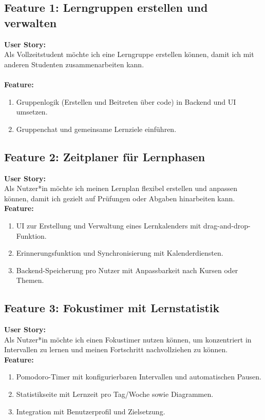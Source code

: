 \documentclass[12pt,a4paper]{article}
\begin{document}
\subsection{Feature 1: Lerngruppen erstellen und verwalten}
\textbf{User Story:}\\
Als Vollzeitstudent möchte ich eine Lerngruppe erstellen können, damit ich mit anderen Studenten zusammenarbeiten kann.\\\\
\textbf{Feature:}
\begin{enumerate}
    \item Gruppenlogik (Erstellen und Beitreten über code) in Backend und UI umsetzen.
    \item Gruppenchat und gemeinsame Lernziele einführen.
\end{enumerate}

\subsection{Feature 2: Zeitplaner für Lernphasen}

\textbf{User Story:}\\
Als Nutzer*in möchte ich meinen Lernplan flexibel erstellen und anpassen können, damit ich gezielt auf Prüfungen oder Abgaben hinarbeiten kann.\\[1em]

\textbf{Feature:}
\begin{enumerate}
  \item UI zur Erstellung und Verwaltung eines Lernkalenders mit drag-and-drop-Funktion.
  \item Erinnerungsfunktion und Synchronisierung mit Kalenderdiensten.
  \item Backend-Speicherung pro Nutzer mit Anpassbarkeit nach Kursen oder Themen.
\end{enumerate}

\subsection{Feature 3: Fokustimer mit Lernstatistik}

\textbf{User Story:}\\
Als Nutzer*in möchte ich einen Fokustimer nutzen können, um konzentriert in Intervallen zu lernen und meinen Fortschritt nachvollziehen zu können.\\[1em]

\textbf{Feature:}
\begin{enumerate}
  \item Pomodoro-Timer mit konfigurierbaren Intervallen und automatischen Pausen.
  \item Statistikseite mit Lernzeit pro Tag/Woche sowie Diagrammen.
  \item Integration mit Benutzerprofil und Zielsetzung.
\end{enumerate}
\end{document}
